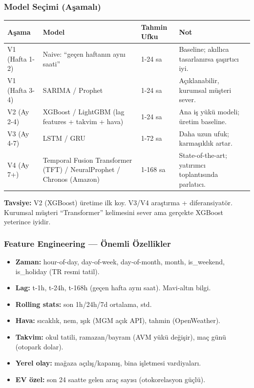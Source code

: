 \documentclass[11pt,a4paper]{article}
\begin{document}
\subsubsection{Model Seçimi (Aşamalı)}

\begin{tabularx}{\textwidth}{l l l X}
\toprule
\textbf{Aşama} & \textbf{Model} & \textbf{Tahmin Ufku} & \textbf{Not} \\
\midrule
V1 (Hafta 1-2) & Naive: ``geçen haftanın aynı saati'' & 1-24 sa & Baseline; akıllıca tasarlanırsa şaşırtıcı iyi. \\
V1 (Hafta 3-4) & SARIMA / Prophet & 1-24 sa & Açıklanabilir, kurumsal müşteri sever. \\
V2 (Ay 2-4) & XGBoost / LightGBM (lag features + takvim + hava) & 1-24 sa & Ana iş yükü modeli; üretim baseline. \\
V3 (Ay 4-7) & LSTM / GRU & 1-72 sa & Daha uzun ufuk; karmaşıklık artar. \\
V4 (Ay 7+) & Temporal Fusion Transformer (TFT) / NeuralProphet / Chronos (Amazon) & 1-168 sa & State-of-the-art; yatırımcı toplantısında parlatıcı. \\
\bottomrule
\end{tabularx}

\textbf{Tavsiye:} V2 (XGBoost) üretime ilk koy. V3/V4 araştırma + diferansiyatör. Kurumsal müşteri ``Transformer'' kelimesini sever ama gerçekte XGBoost yeterince iyidir.

\subsubsection{Feature Engineering — Önemli Özellikler}

\begin{itemize}
    \item \textbf{Zaman:} hour-of-day, day-of-week, day-of-month, month, is\_weekend, is\_holiday (TR resmi tatil).
    \item \textbf{Lag:} t-1h, t-24h, t-168h (geçen hafta aynı saat). Mavi-altın bilgi.
    \item \textbf{Rolling stats:} son 1h/24h/7d ortalama, std.
    \item \textbf{Hava:} sıcaklık, nem, ışık (MGM açık API), tahmin (OpenWeather).
    \item \textbf{Takvim:} okul tatili, ramazan/bayram (AVM yükü değişir), maç günü (otopark dolar).
    \item \textbf{Yerel olay:} mağaza açılış/kapanış, bina işletmesi vardiyaları.
    \item \textbf{EV özel:} son 24 saatte gelen araç sayısı (otokorelasyon güçlü).
\end{itemize}
\end{document}
